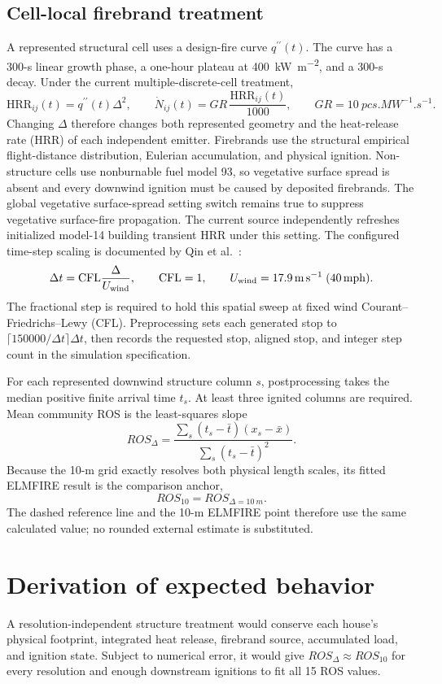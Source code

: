 \subsection{Cell-local firebrand treatment}

A represented structural cell uses a design-fire curve \(q^{\prime\prime}(t)\). The curve has a 300-s linear growth phase, a one-hour plateau at \SI{400}{kW.m^{-2}}, and a 300-s decay. Under the current
multiple-discrete-cell treatment,
\[
 \mathrm{HRR}_{ij}(t)=q^{\prime\prime}(t)\Delta^2,
 \qquad \dot N_{ij}(t)=GR\,\frac{\mathrm{HRR}_{ij}(t)}{1000},
 \qquad GR=\SI{10}{pcs.MW^{-1}.s^{-1}}.
\]
Changing \(\Delta\) therefore changes both represented geometry and the heat-release rate (HRR)
of each independent emitter. Firebrands use the structural empirical
flight-distance distribution, Eulerian accumulation, and physical ignition.
Non-structure cells use nonburnable fuel model 93, so vegetative surface
spread is absent and every downwind ignition must be caused by deposited
firebrands.  The global vegetative surface-spread setting switch remains true to suppress vegetative surface-fire propagation.  The current source independently refreshes initialized model-14 building transient HRR under this setting. The configured time-step scaling is
documented by Qin et al.~\cite{QinEtAl2026}:
\[
 \Delta t=\mathrm{CFL}\frac{\Delta}{U_{\rm wind}},
 \qquad \mathrm{CFL}=1,
 \qquad U_{\rm wind}=\SI{17.9}{m.s^{-1}}\;(\SI{40}{mph}).
\]
The fractional step is required to hold this spatial sweep at fixed wind Courant--Friedrichs--Lewy (CFL).
Preprocessing sets each generated stop to
\(\lceil150000/\Delta t\rceil\Delta t\), then records the requested stop,
aligned stop, and integer step count in the simulation specification.

For each represented downwind structure column \(s\), postprocessing takes the
median positive finite arrival time \(t_s\). At least three ignited columns are
required. Mean community ROS is the least-squares slope
\[
 ROS_\Delta =
 \frac{\sum_s(t_s-\bar t)(x_s-\bar x)}
      {\sum_s(t_s-\bar t)^2}.
\]
Because the 10-m grid exactly resolves both physical length scales, its fitted
ELMFIRE result is the comparison anchor,
\[
 ROS_{10}=ROS_{\Delta=\SI{10}{m}}.
\]
The dashed reference line and the 10-m ELMFIRE point therefore use the same
calculated value; no rounded external estimate is substituted.

\section{Derivation of expected behavior}
A resolution-independent structure treatment would conserve each house's
physical footprint, integrated heat release, firebrand source, accumulated
load, and ignition state. Subject to numerical error, it would give
\(ROS_\Delta\approx ROS_{10}\) for every resolution and enough downstream
ignitions to fit all 15 ROS values.


